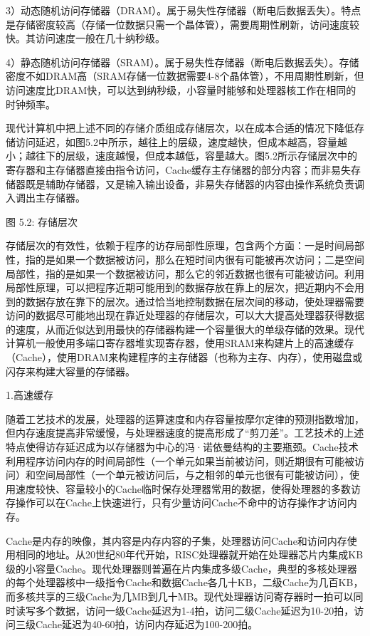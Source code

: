 \documentclass[]{ctexbook}
\begin{document}
3）动态随机访问存储器（DRAM）。属于易失性存储器（断电后数据丢失）。特点是存储密度较高（存储一位数据只需一个晶体管），需要周期性刷新，访问速度较快。其访问速度一般在几十纳秒级。

4）静态随机访问存储器（SRAM）。属于易失性存储器（断电后数据丢失）。存储密度不如DRAM高（SRAM存储一位数据需要4-8个晶体管），不用周期性刷新，但访问速度比DRAM快，可以达到纳秒级，小容量时能够和处理器核工作在相同的时钟频率。

现代计算机中把上述不同的存储介质组成存储层次，以在成本合适的情况下降低存储访问延迟，如图5.2中所示，越往上的层级，速度越快，但成本越高，容量越小；越往下的层级，速度越慢，但成本越低，容量越大。图5.2所示存储层次中的寄存器和主存储器直接由指令访问，Cache缓存主存储器的部分内容；而非易失存储器既是辅助存储器，又是输入输出设备，非易失存储器的内容由操作系统负责调入调出主存储器。

图 5.2: 存储层次

存储层次的有效性，依赖于程序的访存局部性原理，包含两个方面：一是时间局部性，指的是如果一个数据被访问，那么在短时间内很有可能被再次访问；二是空间局部性，指的是如果一个数据被访问，那么它的邻近数据也很有可能被访问。利用局部性原理，可以把程序近期可能用到的数据存放在靠上的层次，把近期内不会用到的数据存放在靠下的层次。通过恰当地控制数据在层次间的移动，使处理器需要访问的数据尽可能地出现在靠近处理器的存储层次，可以大大提高处理器获得数据的速度，从而近似达到用最快的存储器构建一个容量很大的单级存储的效果。现代计算机一般使用多端口寄存器堆实现寄存器，使用SRAM来构建片上的高速缓存（Cache），使用DRAM来构建程序的主存储器（也称为主存、内存），使用磁盘或闪存来构建大容量的存储器。

1.高速缓存

随着工艺技术的发展，处理器的运算速度和内存容量按摩尔定律的预测指数增加，但内存速度提高非常缓慢，与处理器速度的提高形成了``剪刀差''。工艺技术的上述特点使得访存延迟成为以存储器为中心的冯·诺依曼结构的主要瓶颈。Cache技术利用程序访问内存的时间局部性（一个单元如果当前被访问，则近期很有可能被访问）和空间局部性（一个单元被访问后，与之相邻的单元也很有可能被访问），使用速度较快、容量较小的Cache临时保存处理器常用的数据，使得处理器的多数访存操作可以在Cache上快速进行，只有少量访问Cache不命中的访存操作才访问内存。

Cache是内存的映像，其内容是内存内容的子集，处理器访问Cache和访问内存使用相同的地址。从20世纪80年代开始，RISC处理器就开始在处理器芯片内集成KB级的小容量Cache。现代处理器则普遍在片内集成多级Cache，典型的多核处理器的每个处理器核中一级指令Cache和数据Cache各几十KB，二级Cache为几百KB，而多核共享的三级Cache为几MB到几十MB。现代处理器访问寄存器时一拍可以同时读写多个数据，访问一级Cache延迟为1-4拍，访问二级Cache延迟为10-20拍，访问三级Cache延迟为40-60拍，访问内存延迟为100-200拍。
\end{document}
